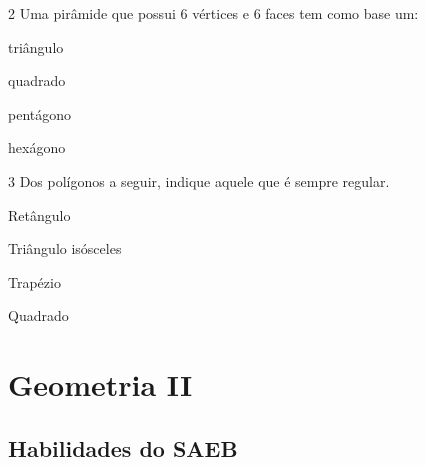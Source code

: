 \pagebreak
\num{2} Uma pirâmide que possui 6 vértices e 6 faces tem como base um:

\begin{escolha}
  \item triângulo

  \item quadrado

  \item pentágono

  \item hexágono
\end{escolha}


\num{3} Dos polígonos a seguir, indique aquele que é sempre regular.

\begin{escolha}
  \item Retângulo

  \item Triângulo isósceles

  \item Trapézio

  \item Quadrado
\end{escolha}

\chapter{Geometria II}

\section*{Habilidades do SAEB}


